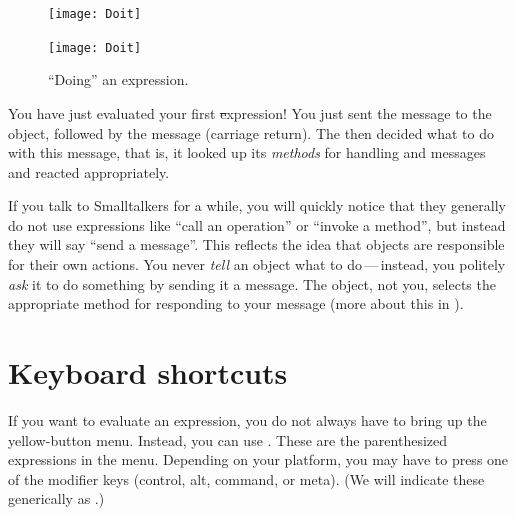 \documentclass[a4paper,10pt,twoside]{book}
\begin{document}
\begin{figure}[htb]
\ifluluelse
	{\centerline {\texttt{[image: Doit]}}}
	{\centerline {\texttt{[image: Doit]}}}
\caption{``Doing'' an expression\label{fig:doit}.}
\end{figure}

You have just evaluated your first \st expression!
You just sent the message  to the  object, followed by the message  (carriage return).
The  then decided what to do with this message, that is, it looked up its \emph{methods} for handling  and  messages and reacted appropriately.

If you talk to Smalltalkers for a while, you will quickly notice that they generally do not use expressions like ``call an operation'' or ``invoke a method'', but instead they will say ``send a message''.
This reflects the idea that objects are responsible for their own actions.
You never \emph{tell} an object what to do\,---\,instead, you politely \emph{ask} it to do something by sending it a message.
The object, not you, selects the appropriate method for responding to your message (more about this in ).


\section{Keyboard shortcuts}

If you want  to evaluate an expression, you do not always have to bring up the yellow-button menu.
Instead, you can use .
These are the parenthesized expressions in the menu.
Depending on your platform, you may have to press one of the modifier keys (control, alt, command, or meta).
(We will indicate these generically as .)
\end{document}
